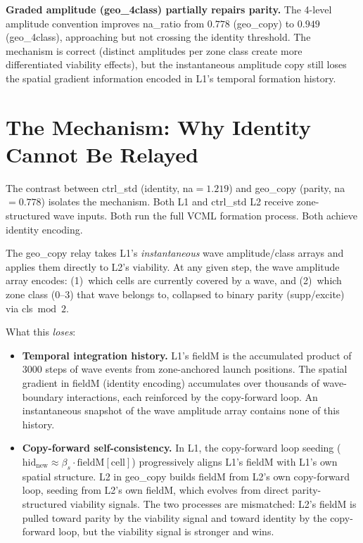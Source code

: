 \documentclass[11pt,a4paper]{article}
\begin{document}
\textbf{Graded amplitude (geo\_4class) partially repairs parity.}
The 4-level amplitude convention improves na\_ratio from $0.778$ (geo\_copy) to $0.949$
(geo\_4class), approaching but not crossing the identity threshold.
The mechanism is correct (distinct amplitudes per zone class create more differentiated
viability effects), but the instantaneous amplitude copy still loses the spatial
gradient information encoded in L1's temporal formation history.

\section{The Mechanism: Why Identity Cannot Be Relayed}

The contrast between ctrl\_std (identity, na$=1.219$) and geo\_copy (parity, na$=0.778$)
isolates the mechanism.
Both L1 and ctrl\_std L2 receive zone-structured wave inputs.
Both run the full VCML formation process.
Both achieve identity encoding.

The geo\_copy relay takes L1's \emph{instantaneous} wave amplitude/class arrays and
applies them directly to L2's viability.
At any given step, the wave amplitude array encodes:
(1)~which cells are currently covered by a wave, and
(2)~which zone class (0--3) that wave belongs to, collapsed to binary parity (supp/excite)
    via cls$\bmod 2$.

What this \emph{loses}:
\begin{itemize}
  \item \textbf{Temporal integration history.} L1's fieldM is the accumulated product
    of $3000$ steps of wave events from zone-anchored launch positions.
    The spatial gradient in fieldM (identity encoding) accumulates over thousands of
    wave-boundary interactions, each reinforced by the copy-forward loop.
    An instantaneous snapshot of the wave amplitude array contains none of this history.
  \item \textbf{Copy-forward self-consistency.} In L1, the copy-forward loop seeding
    ($\mathrm{hid}_\mathrm{new} \approx \beta_s \cdot \mathrm{fieldM}[\mathrm{cell}]$)
    progressively aligns L1's fieldM with L1's own spatial structure.
    L2 in geo\_copy builds fieldM from L2's own copy-forward loop, seeding from L2's
    own fieldM, which evolves from direct parity-structured viability signals.
    The two processes are mismatched: L2's fieldM is pulled toward parity by the
    viability signal and toward identity by the copy-forward loop, but the viability
    signal is stronger and wins.
\end{itemize}
\end{document}
